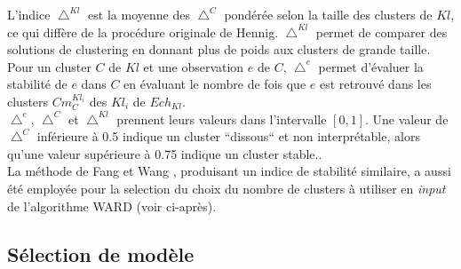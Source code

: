L'indice $\bigtriangleup^{Kl}$ est la moyenne des $\bigtriangleup^{C}$ pondérée selon la taille des clusters de $Kl$, ce qui diffère de la procédure originale de Hennig. $\bigtriangleup^{Kl}$ permet de comparer des solutions de clustering en donnant plus de poids aux clusters de grande taille. Pour un cluster $C$ de $Kl$ et une observation $e$ de $C$, $\bigtriangleup^{e}$ permet d'évaluer la stabilité de $e$ dans $C$ en évaluant le nombre de fois que $e$ est retrouvé dans les clusters $Cm^{Kl_{i}}_{C}$ des $Kl_{i}$ de $Ech_{Kl}$.\\
$\bigtriangleup^{e}$, $\bigtriangleup^{C}$ et  $\bigtriangleup^{Kl}$  prennent leurs valeurs dans l'intervalle $[0,1]$. Une valeur de $\bigtriangleup^{C}$ inférieure à 0.5 indique un cluster “dissous“ et non interprétable, alors qu'une valeur supérieure à 0.75 indique un cluster stable.\citep{hennig2007cluster,Hennig2008}.\\
La méthode de Fang et Wang \citep{Fang2010}, produisant un indice de stabilité similaire, a aussi été employée pour la selection du choix du nombre de clusters à utiliser en \textit{input} de l'algorithme WARD (voir ci-après).

\subsection{Sélection de modèle}\label{modelselec}\label{modelselect}
